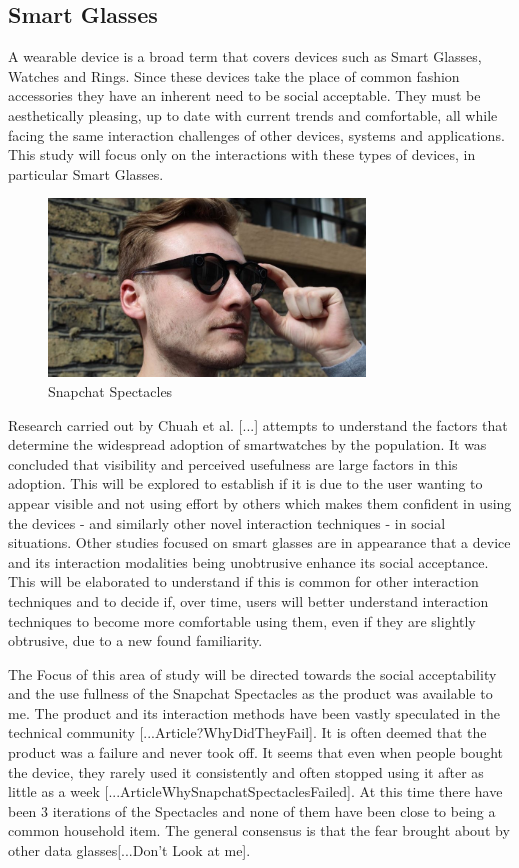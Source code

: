 \documentclass{l4proj}
\begin{document}
\subsection{Smart Glasses}

A wearable device is a broad term that covers devices such as Smart Glasses, Watches and Rings. Since these devices take the place of common fashion accessories they have an inherent need to be social acceptable. They must be  aesthetically pleasing, up to date with current trends and comfortable, all while facing the same interaction challenges of other devices, systems and applications. This study will focus only on the interactions with these types of devices, in particular Smart Glasses.

\begin{figure}[!htb]
    \centering
    \includegraphics[width=0.75\textwidth]{images/spectacles.jpg}
        \caption{Snapchat Spectacles}
        \label{fig:syn1}
\end{figure}

Research carried out by Chuah et al. [...] attempts to understand the factors that determine the widespread adoption of smartwatches by the population. It was concluded that visibility and perceived usefulness are large factors in this adoption. This will be explored to establish if it is due to the user wanting to appear visible and not using effort 
by others which makes them confident in using the devices - and similarly other novel interaction techniques - in social situations. Other studies focused on smart glasses are in appearance that a device and its interaction modalities being unobtrusive enhance its social acceptance. This will be elaborated to understand if this is common for other interaction techniques and to decide if, over time, users will better understand interaction techniques to become more comfortable using them, even if they are slightly obtrusive, due to a new found familiarity.

The Focus of this area of study will be directed towards the social acceptability and the use fullness of the Snapchat Spectacles as the product was available to me. The product and its interaction methods have been vastly speculated in the technical community [...Article?WhyDidTheyFail]. It is often deemed that the product was a failure and never took off. It seems that even when people bought the device, they rarely used it consistently and often stopped using it after as little as a week [...ArticleWhySnapchatSpectaclesFailed]. At this time there have been 3 iterations of the Spectacles and none of them have been close to being a common household item. The general consensus is that the fear brought about by other data glasses[...Don't Look at me].
\end{document}

